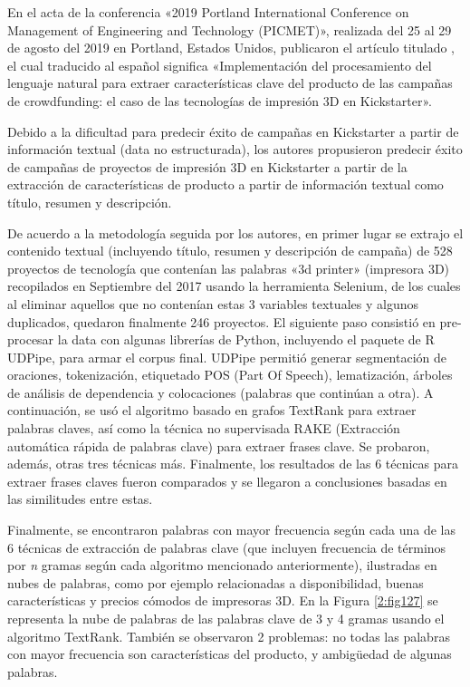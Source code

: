 En el acta de la conferencia «2019 Portland International Conference on Management of Engineering and Technology (PICMET)», realizada del 25 al 29 de agosto del 2019 en Portland, Estados Unidos, \cite{pr_chaichi2019nlp_3dprinting} publicaron el artículo titulado , el cual traducido al español significa «Implementación del procesamiento del lenguaje natural para extraer características clave del producto de las campañas de crowdfunding: el caso de las tecnologías de impresión 3D en Kickstarter».

Debido a la dificultad para predecir éxito de campañas en Kickstarter a partir de información textual (data no estructurada), los autores propusieron predecir éxito de campañas de proyectos de impresión 3D en Kickstarter a partir de la extracción de características de producto a partir de información textual como título, resumen y descripción.

De acuerdo a la metodología seguida por los autores, en primer lugar se extrajo el contenido textual (incluyendo título, resumen y descripción de campaña) de 528 proyectos de tecnología que contenían las palabras «3d printer» (impresora 3D) recopilados en Septiembre del 2017 usando la herramienta Selenium, de los cuales al eliminar aquellos que no contenían estas 3 variables textuales y algunos duplicados, quedaron finalmente 246 proyectos. El siguiente paso consistió en pre-procesar la data con algunas librerías de Python, incluyendo el paquete de R UDPipe, para armar el corpus final. UDPipe permitió generar segmentación de oraciones, tokenización, etiquetado POS (Part Of Speech), lematización, árboles de análisis de dependencia y colocaciones (palabras que continúan a otra). A continuación, se usó el algoritmo basado en grafos TextRank para extraer palabras claves, así como la técnica no supervisada RAKE (Extracción automática rápida de palabras clave) para extraer frases clave. Se probaron, además, otras tres técnicas más.
Finalmente, los resultados de las 6 técnicas para extraer frases claves fueron comparados y se llegaron a conclusiones basadas en las similitudes entre estas.

Finalmente, se encontraron palabras con mayor frecuencia según cada una de las 6 técnicas de extracción de palabras clave (que incluyen frecuencia de términos por \textit{n} gramas según cada algoritmo mencionado anteriormente), ilustradas en nubes de palabras, como por ejemplo relacionadas a disponibilidad, buenas características y precios cómodos de impresoras 3D. En la Figura \ref{2:fig127} se representa la nube de palabras de las palabras clave de 3 y 4 gramas usando el algoritmo TextRank. También se observaron 2 problemas: no todas las palabras con mayor frecuencia son características del producto, y ambigüedad de algunas palabras.

